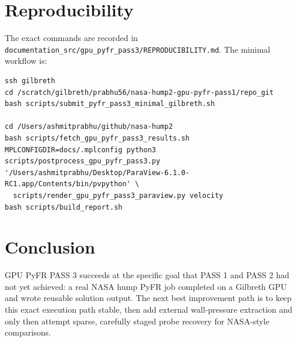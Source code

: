 \documentclass[11pt]{article}
\begin{document}
\section{Reproducibility}
The exact commands are recorded in \texttt{documentation\_src/gpu\_pyfr\_pass3/REPRODUCIBILITY.md}. The minimal workflow is:
\begin{lstlisting}[basicstyle=\ttfamily\small,breaklines=true]
ssh gilbreth
cd /scratch/gilbreth/prabhu56/nasa-hump2-gpu-pyfr-pass1/repo_git
bash scripts/submit_pyfr_pass3_minimal_gilbreth.sh

cd /Users/ashmitprabhu/github/nasa-hump2
bash scripts/fetch_gpu_pyfr_pass3_results.sh
MPLCONFIGDIR=docs/.mplconfig python3 scripts/postprocess_gpu_pyfr_pass3.py
'/Users/ashmitprabhu/Desktop/ParaView-6.1.0-RC1.app/Contents/bin/pvpython' \
  scripts/render_gpu_pyfr_pass3_paraview.py velocity
bash scripts/build_report.sh
\end{lstlisting}

\section{Conclusion}
GPU PyFR PASS 3 succeeds at the specific goal that PASS 1 and PASS 2 had not yet achieved: a real NASA hump PyFR job completed on a Gilbreth GPU and wrote reusable solution output. The next best improvement path is to keep this exact execution path stable, then add external wall-pressure extraction and only then attempt sparse, carefully staged probe recovery for NASA-style comparisons.



\end{document}

